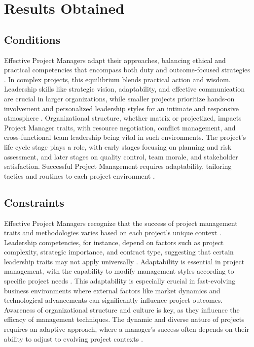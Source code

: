 \documentclass{article}
\begin{document}
\section{Results Obtained}
\subsection{Conditions}


Effective Project Managers adapt their approaches, balancing ethical and practical competencies that encompass both duty and outcome-focused strategies \cite{bredillet2015good}. In complex projects, this equilibrium blends practical action and wisdom. Leadership skills like strategic vision, adaptability, and effective communication are crucial in larger organizations, while smaller projects prioritize hands-on involvement and personalized leadership styles for an intimate and responsive atmosphere \cite{sigurdhssonpatterns}. Organizational structure, whether matrix or projectized, impacts Project Manager traits, with resource negotiation, conflict management, and cross-functional team leadership being vital in such environments. The project's life cycle stage plays a role, with early stages focusing on planning and risk assessment, and later stages on quality control, team morale, and stakeholder satisfaction. Successful Project Management requires adaptability, tailoring tactics and routines to each project environment \cite{hyvari2006success}.

\subsection{Constraints}

Effective Project Managers recognize that the success of project management traits and methodologies varies based on each project's unique context \cite{muller2010leadership}. Leadership competencies, for instance, depend on factors such as project complexity, strategic importance, and contract type, suggesting that certain leadership traits may not apply universally \cite{sigurdhssonpatterns}. Adaptability is essential in project management, with the capability to modify management styles according to specific project needs \cite{markopoulos2005project}. This adaptability is especially crucial in fast-evolving business environments where external factors like market dynamics and technological advancements can significantly influence project outcomes. Awareness of organizational structure and culture is key, as they influence the efficacy of management techniques. The dynamic and diverse nature of projects requires an adaptive approach, where a manager's success often depends on their ability to adjust to evolving project contexts \cite{pollack2016project}.
\end{document}
